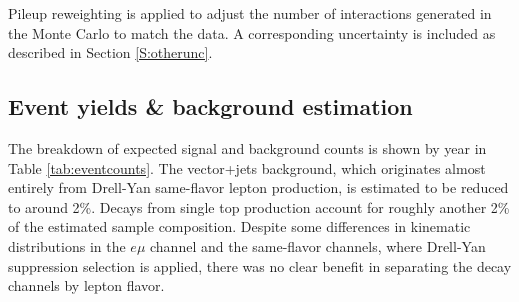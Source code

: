 Pileup reweighting is applied to adjust the number of interactions generated in the Monte Carlo to match the data. A corresponding uncertainty is included as described in Section \ref{S:otherunc}.



\subsection{Event yields \& background estimation}
\label{SS:bg}

The breakdown of expected signal and background counts is shown by year in Table \ref{tab:eventcounts}. The vector+jets background, which originates almost entirely from Drell-Yan same-flavor lepton production, is estimated to be reduced to around 2\%. Decays from single top production account for roughly another 2\% of the estimated sample composition. Despite some differences in kinematic distributions in the $e\mu$ channel and the same-flavor channels, where Drell-Yan suppression selection is applied, there was no clear benefit in separating the decay channels by lepton flavor.


